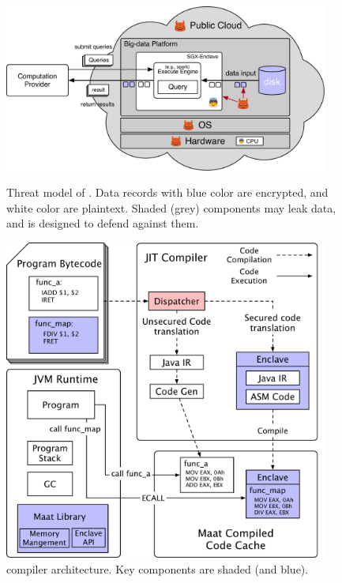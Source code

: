 \begin{figure}[h]
    \centering
    \begin{minipage}{.5\textwidth}    
          \vspace{-.1in}
        \includegraphics[width=0.95\textwidth]{figures/threat_public.pdf}
          \vspace{-.1in}         
        \caption{Threat model of \maat. Data records with blue color are 
encrypted, and white color are plaintext. Shaded (grey) components may leak 
data, and \maat is designed to defend against them.}
        \label{fig:maat-threat}
    \end{minipage}
    \hspace{.3in} 
    \centering
    \begin{minipage}{0.4\textwidth}
         \vspace{-.1in}
        \includegraphics[width=0.95\textwidth]{figures/jit_arch.pdf}
         \vspace{-.1in}
        \caption{\maat compiler architecture. Key components are 
shaded (and blue).}
        \label{fig:maat-arch}
    \end{minipage}
\end{figure}

